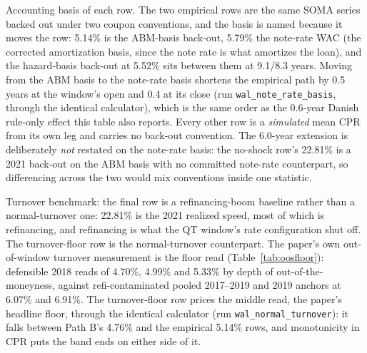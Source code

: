 \documentclass[12pt]{article}
\begin{document}
\begin{table}[H]
\begin{threeparttable}
\begin{tablenotes}[flushleft]
\item Accounting basis of each row. The two empirical rows are the same SOMA series backed out under two coupon conventions, and the basis is named because it moves the row: 5.14\% is the ABM-basis back-out, 5.79\% the note-rate WAC (the corrected amortization basis, since the note rate is what amortizes the loan), and the hazard-basis back-out at 5.52\% sits between them at 9.1/8.3 years. Moving from the ABM basis to the note-rate basis shortens the empirical path by 0.5 years at the window's open and 0.4 at its close (run \texttt{wal\_note\_rate\_basis}, through the identical calculator), which is the same order as the 0.6-year Danish rule-only effect this table also reports. Every other row is a \emph{simulated} mean CPR from its own leg and carries no back-out convention. The 6.0-year extension is deliberately \emph{not} restated on the note-rate basis: the no-shock row's 22.81\% is a 2021 back-out on the ABM basis with no committed note-rate counterpart, so differencing across the two would mix conventions inside one statistic.
\item Turnover benchmark: the final row is a refinancing-boom baseline rather than a normal-turnover one: 22.81\% is the 2021 realized speed, most of which is refinancing, and refinancing is what the QT window's rate configuration shut off. The turnover-floor row is the normal-turnover counterpart. The paper's own out-of-window turnover measurement is the floor read (Table~\ref{tab:oosfloor}): defensible 2018 reads of 4.70\%, 4.99\% and 5.33\% by depth of out-of-the-moneyness, against refi-contaminated pooled 2017--2019 and 2019 anchors at 6.07\% and 6.91\%. The turnover-floor row prices the middle read, the paper's headline floor, through the identical calculator (run \texttt{wal\_normal\_turnover}): it falls between Path B's 4.76\% and the empirical 5.14\% rows, and monotonicity in CPR puts the band ends on either side of it.
\end{tablenotes}
\end{threeparttable}
\end{table}
\end{document}
